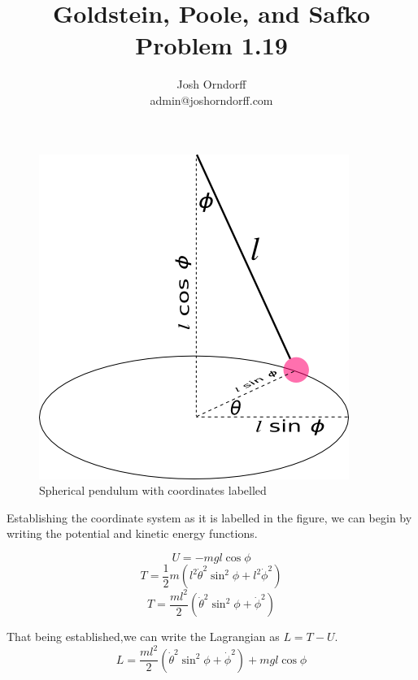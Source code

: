 \documentclass[10pt,a4paper]{article}
\begin{document}
\title{Goldstein, Poole, and Safko Problem 1.19}
\author{Josh Orndorff \\ admin@joshorndorff.com}
\maketitle

\begin{figure}[hbtp]
\caption{Spherical pendulum with coordinates labelled}
\includegraphics[scale=.6]{Goldstein1-19.png}
\end{figure}


Establishing the coordinate system as it is labelled in the figure, we can begin by writing the potential and kinetic energy functions.

\begin{equation}
U=-mgl\cos\phi
\end{equation}
\begin{equation}
T= \frac{1}{2}m\left(l^2\dot{\theta}^2 \sin^2\phi +l^2\dot{\phi}^2\right)
\end{equation}
\begin{equation}
T= \frac{ml^2}{2}\left(\dot{\theta}^2 \sin^2\phi +\dot{\phi}^2\right)
\end{equation}

That being established,we can write the Lagrangian as $L=T-U$.
\begin{equation}
L= \frac{ml^2}{2}\left(\dot{\theta}^2 \sin^2\phi +\dot{\phi}^2\right) + mgl\cos\phi
\end{equation}
\end{document}
